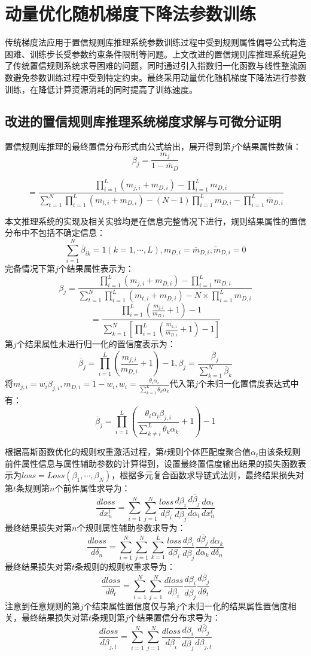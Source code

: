 \documentclass{cjc}
\begin{document}
\section{动量优化随机梯度下降法参数训练}
传统梯度法应用于置信规则库推理系统参数训练过程中受到规则属性偏导公式构造困难、训练步长受参数约束条件限制等问题。上文改进的置信规则库推理系统避免了传统置信规则系统求导困难的问题，同时通过引入指数归一化函数与线性整流函数避免参数训练过程中受到特定约束。最终采用动量优化随机梯度下降法进行参数训练，在降低计算资源消耗的同时提高了训练速度。
\subsection{改进的置信规则库推理系统梯度求解与可微分证明}
置信规则库推理的最终置信分布形式由公式给出，展开得到第$j$个结果属性数值：
$$\beta_j=\frac{m_j}{1-\overline{m}_D}$$
\begin{small}
    $$=\frac{\prod_{i=1}^L(m_{j,i}+m_{D,i})-\prod_{i=1}^Lm_{D,i}}{\sum_{t=1}^N\prod_{i=1}^L(m_{t,i}+m_{D,i})-(N-1)\prod_{i=1}^Lm_{D,i}-\prod_{i=1}^L\overline{m}_{D,i}}$$
\end{small}
本文推理系统的实现及相关实验均是在信息完整情况下进行，规则结果属性的置信分布中不包括不确定信息：
$$\sum_{i=1}^N\overline{\beta}_{ik}=1(k=1,\cdots,L),m_{D,i}=\overline{m}_{D,i},\widetilde{m}_{D,i}=0$$
完备情况下第$j$个结果属性表示为：
$$\beta_j=\frac{\prod_{i=1}^L(m_{j,i}+m_{D,i})-\prod_{i=1}^Lm_{D,i}}{\sum_{t=1}^N\prod_{i=1}^L(m_{t,i}+m_{D,i})-N\times\prod_{i=1}^Lm_{D,i}}$$
$$=\frac{\prod_{i=1}^L(\frac{m_{j,i}}{m_{D,i}}+1)-1}{\sum_{k=1}^N[\prod_{i=1}^L(\frac{m_{k,i}}{m_{D,i}}+1)-1]}$$
第$j$个结果属性未进行归一化的置信度表示为：
$$\overline{\beta}_j=\prod_{i=1}^L(\frac{m_{j,i}}{m_{D,i}}+1)-1,\beta_j=\frac{\overline{\beta}_j}{\sum_{k=1}^N\overline{\beta}_k}$$
将$m_{j,i}=w_i\beta_{j,i},m_{D,i}=1-w_i,w_i=\frac{\theta_i\alpha_i}{\sum_{k=1}^L\theta_k\alpha_k}$代入第$j$个未归一化置信度表达式中有：
$$\overline{\beta}_j=\prod_{i=1}^L(\frac{\theta_i\alpha_i\beta_{j,i}}{\sum_{k\neq i}^L{\theta_k\alpha_k}}+1)-1$$

根据高斯函数优化的规则权重激活过程，第$t$规则个体匹配度聚合值$\alpha_t$由该条规则前件属性信息与属性辅助参数的计算得到，设置最终置信度输出结果的损失函数表示为$loss=Loss(\beta_1,\cdots,\beta_N)$，根据多元复合函数求导链式法则，最终结果损失对第$t$条规则第$n$个前件属性求导为：
$$\frac{dloss}{dx_n^t}=\sum_{i=1}^N\sum_{j=1}^N \frac{loss}{d\beta_i}\frac{d\beta_i}{d\overline{\beta}_j}\frac{d\overline{\beta}_j}{d\alpha_t}\frac{d\alpha_t}{dx_n^t}$$
最终结果损失对第$n$个规则属性辅助参数求导为：
$$\frac{dloss}{d\delta_n}=\sum_{i=1}^N\sum_{j=1}^N\sum_{k=1}^L \frac{loss}{d\beta_i}\frac{d\beta_i}{d\overline{\beta}_j}\frac{d\overline{\beta}_j}{d\alpha_k}\frac{d\alpha_k}{d\delta_n}$$
最终结果损失对第$t$条规则的规则权重求导为：
$$\frac{dloss}{d\theta_t}=\sum_{i=1}^N\sum_{j=1}^N \frac{dloss}{d\beta_i}\frac{d\beta_i}{d\overline{\beta}_j}\frac{d\overline{\beta}_j}{d\theta_t}$$
注意到任意规则的第$j$个结束属性置信度仅与第$j$个未归一化的结果属性置信度相关，最终结果损失对第$t$条规则第$j$个结果置信分布求导为：
$$\frac{dloss}{d\beta_{j,t}}=\sum_{i=1}^N\sum_{j=1}^N\frac{dloss}{d\beta_i}\frac{d\beta_i}{d\overline{\beta}_j}\frac{d\overline{\beta}_j}{d\beta_{j,t}}$$
\end{document}
